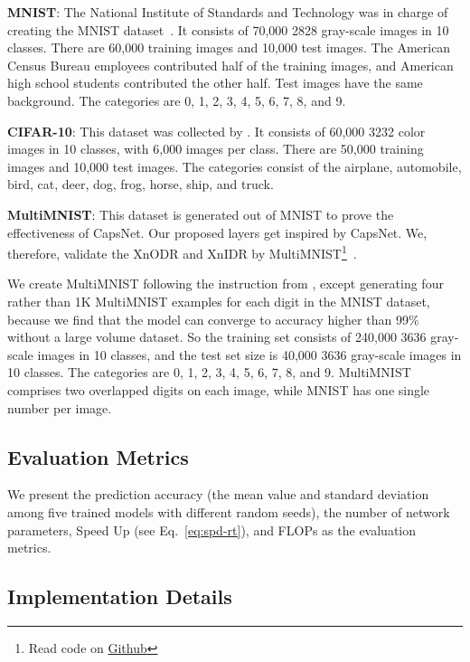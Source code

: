 \documentclass[sn-mathphys,iicol,Numbered]{sn-jnl}
\begin{document}
\textbf{MNIST}: The National Institute of Standards and Technology was in charge of creating the MNIST dataset~\cite{A50_mnst}. It consists of 70,000 2828 gray-scale images in 10 classes. There are 60,000 training images and 10,000 test images. The American Census Bureau employees contributed half of the training images, and American high school students contributed the other half. Test images have the same background. The categories are 0, 1, 2, 3, 4, 5, 6, 7, 8, and 9.  

\textbf{CIFAR-10}: This dataset was collected by \cite{A49_cfr10}. It consists of 60,000 3232 color images in 10 classes, with 6,000 images per class. There are 50,000 training images and 10,000 test images. The categories consist of the airplane, automobile, bird, cat, deer, dog, frog, horse, ship, and truck.

\textbf{MultiMNIST}: This dataset is generated out of MNIST to prove the effectiveness of CapsNet. Our proposed layers get inspired by CapsNet. We, therefore, validate the XnODR and XnIDR by MultiMNIST\footnote{Read code on \hyperlink{https://github.com/jiansfoggy/CODE-SHOW/blob/master/Python/Multi\_Mnist/fast\_generate\_multimnist.py}{Github}}~\citep{A1_caps}.

We create MultiMNIST following the instruction from \cite{A1_caps}, except generating four rather than 1K MultiMNIST examples for each digit in the MNIST dataset, because we find that the model can converge to accuracy higher than 99\% without a large volume dataset. So the training set consists of 240,000 3636 gray-scale images in 10 classes, and the test set size is 40,000 3636 gray-scale images in 10 classes. The categories are 0, 1, 2, 3, 4, 5, 6, 7, 8, and 9. MultiMNIST comprises two overlapped digits on each image, while MNIST has one single number per image.

\subsection{Evaluation Metrics} \label{sec:4.2}

We present the prediction accuracy (the mean value and standard deviation among five trained models with different random seeds), the number of network parameters, Speed Up (see Eq.~\ref{eq:spd-rt}), and FLOPs as the evaluation metrics.

\subsection{Implementation Details} \label{sec:4.3}
\end{document}
